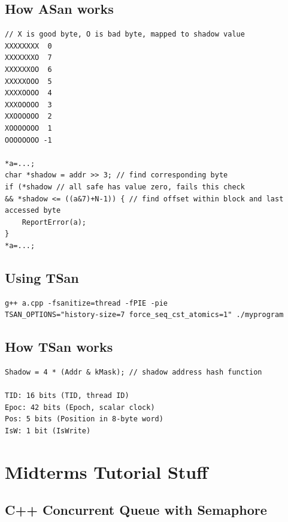 \documentclass{article}
\begin{document}
\subsection{How ASan works}
\begin{lstlisting}
// X is good byte, O is bad byte, mapped to shadow value
XXXXXXXX  0
XXXXXXXO  7
XXXXXXOO  6
XXXXXOOO  5
XXXXOOOO  4
XXXOOOOO  3
XXOOOOOO  2
XOOOOOOO  1
OOOOOOOO -1

*a=...;
char *shadow = addr >> 3; // find corresponding byte
if (*shadow // all safe has value zero, fails this check
&& *shadow <= ((a&7)+N-1)) { // find offset within block and last accessed byte
    ReportError(a);
}
*a=...;
\end{lstlisting}

\subsection{Using TSan}
\begin{lstlisting}
g++ a.cpp -fsanitize=thread -fPIE -pie
TSAN_OPTIONS="history-size=7 force_seq_cst_atomics=1" ./myprogram
\end{lstlisting}

\subsection{How TSan works}
\begin{lstlisting}
Shadow = 4 * (Addr & kMask); // shadow address hash function

TID: 16 bits (TID, thread ID)
Epoc: 42 bits (Epoch, scalar clock)
Pos: 5 bits (Position in 8-byte word)
IsW: 1 bit (IsWrite)
\end{lstlisting}

\section{Midterms Tutorial Stuff}

\subsection{C++ Concurrent Queue with Semaphore}
\end{document}
